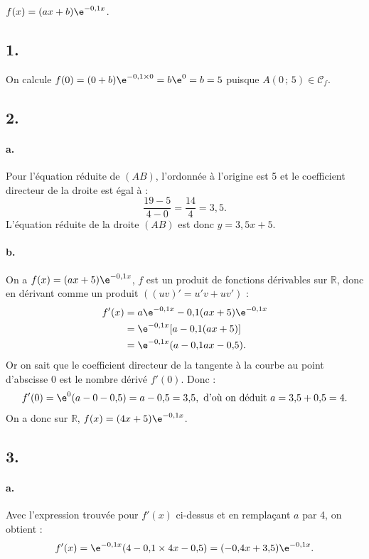 \( f(x) = (ax + b)\e^{-0{,}1x} \).

\subsection*{1.}

On calcule \( f(0) = (0 + b)\e^{-0{,}1 \times 0} = b\e^0 = b = 5 \) puisque \( A(0\,;\,5) \in \mathcal{C}_f \).

\subsection*{2.}

\paragraph{a.} Pour l'équation réduite de \( (AB) \), l'ordonnée à l'origine est 5 et le coefficient directeur de la droite est égal à :
\[
\dfrac{19 - 5}{4 - 0} = \dfrac{14}{4} = 3{,}5.
\]
L'équation réduite de la droite \( (AB) \) est donc \( y = 3{,}5x + 5 \).

\paragraph{b.} On a \( f(x) = (ax + 5) \e^{-0{,}1x} \), \( f \) est un produit de fonctions dérivables sur \( \mathbb{R} \), donc en dérivant comme un produit \( ( (uv)' = u'v + uv' ) \) :
\begin{align*}
f'(x) &= a\e^{-0{,}1x} - 0{,}1(ax + 5)\e^{-0{,}1x} \\
&= \e^{-0{,}1x} [a - 0{,}1(ax + 5)] \\
&= \e^{-0{,}1x}(a - 0{,}1ax - 0{,}5).
\end{align*}
Or on sait que le coefficient directeur de la tangente à la courbe au point d'abscisse 0 est le nombre dérivé \( f'(0) \). Donc :
\[
f'(0) = \e^0(a - 0 - 0{,}5) = a - 0{,}5 = 3{,}5, \text{ d'où on déduit } a = 3{,}5 + 0{,}5 = 4.
\]
On a donc sur \( \mathbb{R} \), \( f(x) = (4x + 5)\e^{-0{,}1x} \).

\subsection*{3.}

\paragraph{a.} Avec l'expression trouvée pour \( f'(x) \) ci-dessus et en remplaçant \( a \) par 4, on obtient :
\[
f'(x) = \e^{-0{,}1x}(4 - 0{,}1 \times 4x - 0{,}5) = (-0{,}4x + 3{,}5)\e^{-0{,}1x}.
\]

